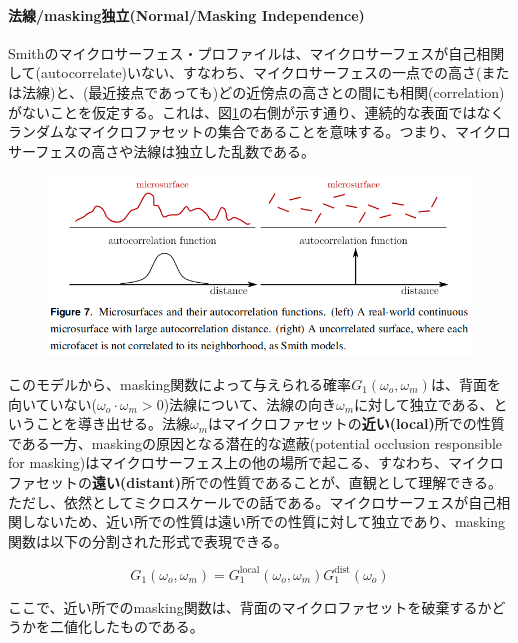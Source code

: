 \documentclass[a4j,xelatex,ja=standard]{bxjsarticle}
\begin{document}
\paragraph{法線/masking独立(Normal/Masking Independence)}

Smithのマイクロサーフェス・プロファイルは、マイクロサーフェスが自己相関して(autocorrelate)いない、すなわち、マイクロサーフェスの一点での高さ(または法線)と、(最近接点であっても)どの近傍点の高さとの間にも相関(correlation)がないことを仮定する。これは、図\ref{fig:7}の右側が示す通り、連続的な表面ではなくランダムなマイクロファセットの集合であることを意味する。つまり、マイクロサーフェスの高さや法線は独立した乱数である。

\begin{figure}
    \includegraphics[width=\textwidth]{Figure7.png}
    \caption{}
    \label{fig:7}
\end{figure}

このモデルから、masking関数によって与えられる確率$G_1(\omega_o, \omega_m)$は、背面を向いていない($\omega_o \cdot \omega_m > 0$)法線について、法線の向き$\omega_m$に対して独立である、ということを導き出せる。法線$\omega_m$はマイクロファセットの\textbf{近い(local)}所での性質である一方、maskingの原因となる潜在的な遮蔽(potential occlusion responsible for masking)はマイクロサーフェス上の他の場所で起こる、すなわち、マイクロファセットの\textbf{遠い(distant)}所での性質であることが、直観として理解できる。ただし、依然としてミクロスケールでの話である。マイクロサーフェスが自己相関しないため、近い所での性質は遠い所での性質に対して独立であり、masking関数は以下の分割された形式で表現できる。

\begin{equation}
    G_1(\omega_o, \omega_m) = G_1^{\text{local}}(\omega_o, \omega_m) G_1^{\text{dist}}(\omega_o)
    \label{eq:38}
\end{equation}

ここで、近い所でのmasking関数は、背面のマイクロファセットを破棄するかどうかを二値化したものである。
\end{document}
